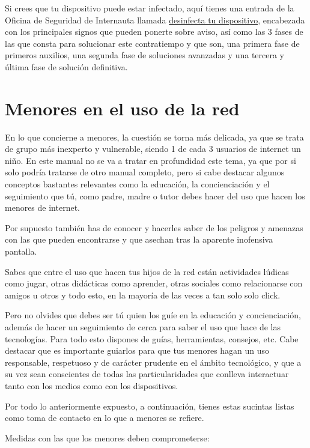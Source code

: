 \documentclass[
  spanish,
  a4paper,
  openany]{book}
\begin{document}
Si crees que tu dispositivo puede estar infectado, aquí tienes una entrada de la Oficina de Seguridad de Internauta llamada \href{https://www.osi.es/es/desinfecta-tu-ordenador}{desinfecta tu dispositivo}, encabezada con los principales signos que pueden ponerte sobre aviso, así como las 3 fases de las que consta para solucionar este contratiempo y que son, una primera fase de primeros auxilios, una segunda fase de soluciones avanzadas y una tercera y última fase de solución definitiva.

\hypertarget{menores-en-el-uso-de-la-red}{%
\section{Menores en el uso de la red}\label{menores-en-el-uso-de-la-red}}

En lo que concierne a menores, la cuestión se torna más delicada, ya que se trata de grupo más inexperto y vulnerable, siendo 1 de cada 3 usuarios de internet un niño. En este manual no se va a tratar en profundidad este tema, ya que por si solo podría tratarse de otro manual completo, pero si cabe destacar algunos conceptos bastantes relevantes como la educación, la concienciación y el seguimiento que tú, como padre, madre o tutor debes hacer del uso que hacen los menores de internet.

Por supuesto también has de conocer y hacerles saber de los peligros y amenazas con las que pueden encontrarse y que asechan tras la aparente inofensiva pantalla.

Sabes que entre el uso que hacen tus hijos de la red están actividades lúdicas como jugar, otras didácticas como aprender, otras sociales como relacionarse con amigos u otros y todo esto, en la mayoría de las veces a tan solo solo click.

Pero no olvides que debes ser tú quien los guíe en la educación y concienciación, además de hacer un seguimiento de cerca para saber el uso que hace de las tecnologías. Para todo esto dispones de guías, herramientas, consejos, etc. Cabe destacar que es importante guiarlos para que tus menores hagan un uso responsable, respetuoso y de carácter prudente en el ámbito tecnológico, y que a su vez sean conscientes de todas las particularidades que conlleva interactuar tanto con los medios como con los dispositivos.

Por todo lo anteriormente expuesto, a continuación, tienes estas sucintas listas como toma de contacto en lo que a menores se refiere.

Medidas con las que los menores deben comprometerse:
\end{document}
